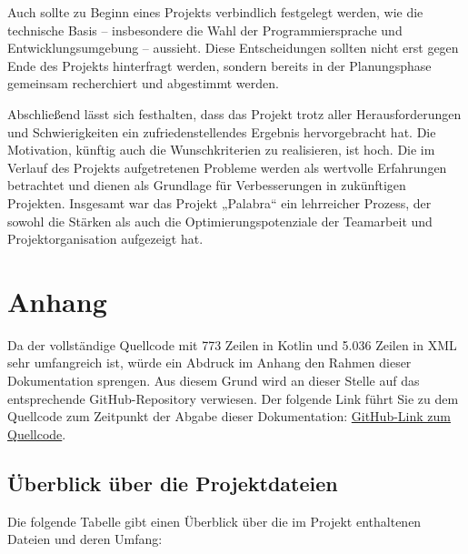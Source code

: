 \documentclass[12pt,a4paper]{article}
\begin{document}
Auch sollte zu Beginn eines Projekts verbindlich festgelegt werden, wie die technische Basis – insbesondere die Wahl der Programmiersprache und Entwicklungsumgebung – aussieht. Diese Entscheidungen sollten nicht erst gegen Ende des Projekts hinterfragt werden, sondern bereits in der Planungsphase gemeinsam recherchiert und abgestimmt werden.

Abschließend lässt sich festhalten, dass das Projekt trotz aller Herausforderungen und Schwierigkeiten ein zufriedenstellendes Ergebnis hervorgebracht hat. Die Motivation, künftig auch die Wunschkriterien zu realisieren, ist hoch. Die im Verlauf des Projekts aufgetretenen Probleme werden als wertvolle Erfahrungen betrachtet und dienen als Grundlage für Verbesserungen in zukünftigen Projekten. Insgesamt war das Projekt „Palabra“ ein lehrreicher Prozess, der sowohl die Stärken als auch die Optimierungspotenziale der Teamarbeit und Projektorganisation aufgezeigt hat.

\appendix

\section{Anhang}

Da der vollständige Quellcode mit 773 Zeilen in Kotlin und 5.036 Zeilen in XML sehr umfangreich ist, würde ein Abdruck im Anhang den Rahmen dieser Dokumentation sprengen. Aus diesem Grund wird an dieser Stelle auf das entsprechende GitHub-Repository verwiesen. Der folgende Link führt Sie zu dem Quellcode zum Zeitpunkt der Abgabe dieser Dokumentation:  
\href{https://github.com/Erik-Donath/Palabra/tree/cc55c524ebff2f6db85a36f6ec2c0afb23070e2f}{GitHub-Link zum Quellcode}.

\subsection*{Überblick über die Projektdateien}

Die folgende Tabelle gibt einen Überblick über die im Projekt enthaltenen Dateien und deren Umfang:
\end{document}
